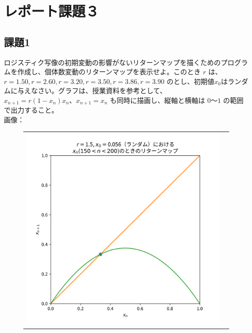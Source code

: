 \section{レポート課題３}
\subsection{課題1}
ロジスティク写像の初期変動の影響がないリターンマップを描くためのプログラムを作成し、個体数変動のリターンマップを表示せよ。このとき $r$ は、$r = 1.50, r = 2.60, r = 3.20, r = 3.50, r = 3.86, r = 3.90$ のとし、初期値$x_0$はランダムに与えなさい。グラフは、授業資料を参考として、 $x_{n+1} = r(1 − x_n)x_n、x_{n+1} = x_n$ も同時に描画し、縦軸と横軸は $0～1$ の範囲で出力すること。\\
画像：\\
\begin{figure}[htbp]
  \begin{tabular}{cc}
    \begin{minipage}[t]{0.45\hsize}
      \centering
      \includegraphics[keepaspectratio, scale=0.3]{images/Problem3/report4_1.png}
    \end{minipage} &
    \begin{minipage}[t]{0.45\hsize}
      \centering

\end{minipage}
\end{tabular}
\end{figure}
